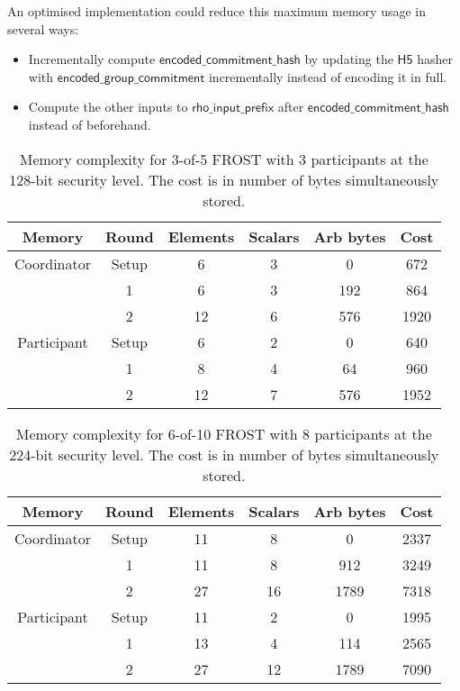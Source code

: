 An optimised implementation could reduce this maximum memory usage in several
ways:

\begin{itemize}
	\item Incrementally compute $\mathsf{encoded\_commitment\_hash}$ by updating
	the $\mathsf{H5}$ hasher with $\mathsf{encoded\_group\_commitment}$
	incrementally instead of encoding it in full.
	\item Compute the other inputs to $\mathsf{rho\_input\_prefix}$ after
	$\mathsf{encoded\_commitment\_hash}$ instead of beforehand.
\end{itemize}

\begin{table}
	\centering
	\begin{tabular}{c c c c c c}
		\toprule
		Memory & Round & Elements & Scalars & Arb bytes & Cost \\ \midrule
		Coordinator & Setup & 6 & 3 & 0 & 672 \\
		            & 1 & 6 & 3 & 192 & 864 \\
		            & 2 & 12 & 6 & 576 & 1920 \\
		\midrule
		Participant & Setup & 6 & 2 & 0 & 640 \\
		            & 1 & 8 & 4 & 64 & 960 \\
		            & 2 & 12 & 7 & 576 & 1952 \\
		\bottomrule
	\end{tabular}
	\caption{Memory complexity for 3-of-5 FROST with 3 participants at the 128-bit security level. The cost is in number of bytes simultaneously stored.}
\end{table}

\begin{table}
	\centering
	\begin{tabular}{c c c c c c}
		\toprule
		Memory & Round & Elements & Scalars & Arb bytes & Cost \\ \midrule
		Coordinator & Setup & 11 & 8 & 0 & 2337 \\
		            & 1 & 11 & 8 & 912 & 3249 \\
		            & 2 & 27 & 16 & 1789 & 7318 \\
		\midrule
		Participant & Setup & 11 & 2 & 0 & 1995 \\
		            & 1 & 13 & 4 & 114 & 2565 \\
		            & 2 & 27 & 12 & 1789 & 7090 \\
		\bottomrule
	\end{tabular}
	\caption{Memory complexity for 6-of-10 FROST with 8 participants at the 224-bit security level. The cost is in number of bytes simultaneously stored.}
\end{table}

